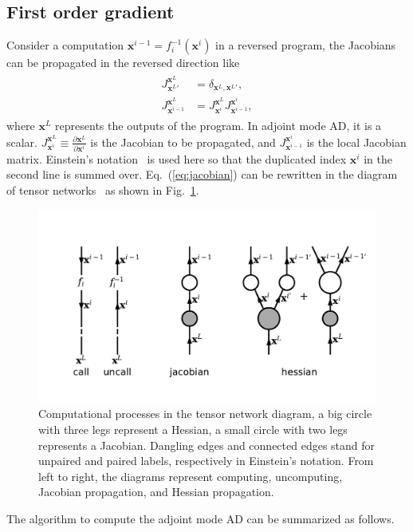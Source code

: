 \documentclass[aps,twocolumn,longbibliography,english,superscriptaddress]{revtex4-1}
\newcommand{\<}{\langle}
\renewcommand{\>}{\rangle}
\newcommand{\out}{{\vx^L}}
\newcommand{\vx}{{\mathbf{x}}}
\newcommand{\Eq}[1]{Eq.~(\ref{#1})}
\newcommand{\Fig}[1]{Fig.~\ref{#1}}
\theoremstyle{definition}\newtheorem{definition}{\textit{Definition}}
\begin{document}
\subsection{First order gradient}\label{sec:jacobian}
Consider a computation $\vx^{i-1} = f_{i}^{-1}(\vx^{i})$ in a reversed program, the Jacobians can be propagated in the reversed direction like
\begin{align}
    \begin{split}
        J^{\out}_{\out'} &= \delta_{\out,\out'},\\
        J^{\out}_{\vx^{i-1}} &= J^{\out}_{\vx^i} J^{\vx^i}_{\vx^{i-1}},
    \end{split}\label{eq:jacobian}
\end{align}
where $\out$ represents the outputs of the program. In adjoint mode AD, it is a scalar.
$J^{\out}_{\vx^i} \equiv \frac{\partial \out}{\partial \vx^i}$ is the Jacobian to be propagated, and $J^{\vx^i}_{\vx^{i-1}}$ is the local Jacobian matrix. Einstein's notation~\cite{Einsum} is used here so that the duplicated index $\vx^{i}$ in the second line is summed over.
\Eq{eq:jacobian} can be rewritten in the diagram of tensor networks~\cite{Orus2014} as shown in \Fig{fig:ad}.
\begin{figure}
    \centerline{\includegraphics[width=0.95\columnwidth,trim={0.5cm 1cm 0 1cm},clip]{images/ad.pdf}}
    \caption{Computational processes in the tensor network diagram, a big circle with three legs represent a Hessian, a small circle with two legs represents a Jacobian. Dangling edges and connected edges stand for unpaired and paired labels, respectively in Einstein's notation. From left to right, the diagrams represent computing, uncomputing, Jacobian propagation, and Hessian propagation.}\label{fig:ad}
\end{figure}
The algorithm to compute the adjoint mode AD can be summarized as follows.
\end{document}
